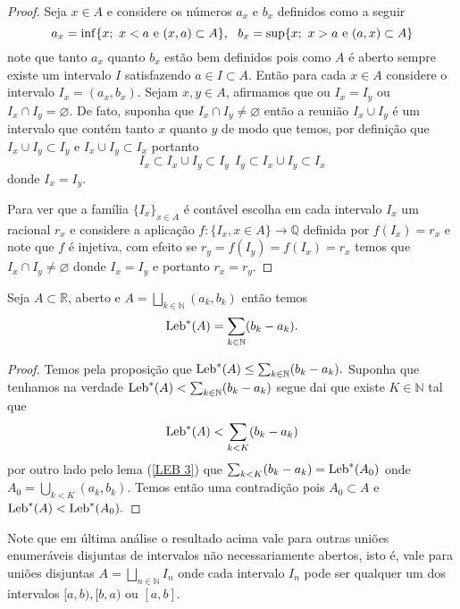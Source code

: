 \begin{proof}
Seja $x\in A$  e considere os números $a_x$ e $b_x$ definidos como a seguir
$$
a_x=\inf\{x;~x<a~\textnormal{e}~(x,a)\subset A\},~~b_x=\sup \{x;~x>a~\textnormal{e}~(a,x)\subset A\}
$$
note que  tanto $a_x$ quanto $b_x$ estão bem definidos pois como $A$ é  aberto sempre existe um intervalo $I$ satisfazendo $a\in I\subset A$. Então para cada $x\in A$ considere o intervalo $I_x=(a_x,b_x)$. Sejam $x,y\in A$, afirmamos que ou $I_x=I_y$ ou $I_x\cap I_y=\varnothing.$ De fato, suponha que $I_x\cap I_y\neq \varnothing$ então a reunião $I_x\cup I_y$ é um intervalo que contém tanto $x$ quanto $y$ de modo que temos, por definição que $  I_ x\cup I_y\subset I_y$ e $I_x\cup I_y\subset I_x$ portanto 
$$
I_x\subset I_x\cup I_y\subset I_y~~ I_y\subset I_x\cup I_y\subset I_x
$$
donde $I_x=I_y$.

Para ver que a família $\{I_x\}_{x\in A}$ é contável escolha em cada intervalo $I_x$ um racional $r_x$ e considere a aplicação  $f:\{I_x,x\in A\}\to \mathbb{Q}$ definida por $f(I_x)=r_x$ e note que $f$ é injetiva, com efeito se 
$r_y=f(I_y)=f(I_x)=r_x$ temos que $I_x\cap I_y\neq \varnothing$ donde $I_x=I_y$ e portanto $r_x=r_y$.

\end{proof}




\begin{lema}\label{LEB 4}
Seja $A\subset \mathbb{R}$,  aberto e $A=\bigsqcup_{k\in \mathbb{N}}(a_k,b_k)$ então temos 
$$
\textnormal{Leb}^{*}(A)=\sum_{k\in \mathbb{N}}(b_k-a_k).
$$
\end{lema}

\begin{proof}
Temos pela proposição  que $\textnormal{Leb}^{*}(A)\leq \sum_{k\in \mathbb{N}}(b_k-a_k).$ Suponha que tenhamos na verdade 
$\textnormal{Leb}^{*}(A)< \sum_{k\in \mathbb{N}}(b_k-a_k)$ segue dai que existe $K\in \mathbb{N}$ tal que 
$$
\textnormal{Leb}^{*}(A)< \sum_{k<K}(b_k-a_k)
$$
 por outro lado pelo lema (\ref{LEB 3}) que $\sum_{k<K}(b_k-a_k)=\textnormal{Leb}^{*}(A_0)$ onde $A_0=\bigcup_{k<K}(a_k,b_k)$.
Temos então uma contradição pois $A_0\subset A$ e $\textnormal{Leb}^{*}(A)<\textnormal{Leb}^{*}(A_0).$
\end{proof}

Note que em última análise o resultado acima vale para outras uniões enumeráveis disjuntas de intervalos não necessariamente abertos, isto é, vale para uniões disjuntas $A=\bigsqcup_{n\in\mathbb{N}} I_n$ onde cada intervalo $I_n$ pode ser qualquer um dos intervalos $[a,b),[b,a)$ ou $[a,b]$. 




